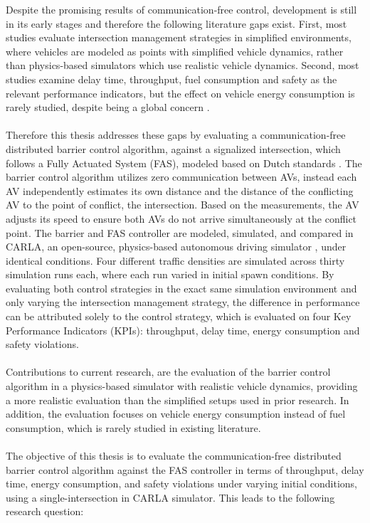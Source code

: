 Despite the promising results of communication-free control, development is still in its early stages and therefore the following literature gaps exist. First, most studies evaluate intersection management strategies in simplified environments, where vehicles are modeled as points with simplified vehicle dynamics, rather than physics-based simulators which use realistic vehicle dynamics. Second, most studies examine delay time, throughput, fuel consumption and safety as the relevant performance indicators, but the effect on vehicle energy consumption is rarely studied, despite being a global concern \parencite{hadjigeorgiou2022real}.
\\\\
Therefore this thesis addresses these gaps by evaluating a communication-free distributed barrier control algorithm, against a signalized intersection, which follows a Fully Actuated System (FAS), modeled based on Dutch standards \parencite{wilson2014handboek}. The barrier control algorithm utilizes zero communication between AVs, instead each  AV independently estimates its own distance and the distance of the conflicting AV to the  point of conflict, the intersection. Based on the measurements, the AV adjusts its speed to ensure both AVs do not arrive simultaneously at the conflict point. The barrier and FAS controller are modeled, simulated, and compared in CARLA, an open-source, physics-based autonomous driving simulator \parencite{dosovitskiy2017carla}, under identical conditions. Four different traffic densities are simulated across thirty simulation runs each, where each run varied in initial spawn conditions. By evaluating both control strategies in the exact same simulation environment and only varying the intersection management strategy, the difference in performance can be attributed solely to the control strategy, which is evaluated on four Key Performance Indicators (KPIs): throughput, delay time, energy consumption and safety violations.       
\\\\
Contributions to current research, are the evaluation of the barrier control algorithm in a physics-based simulator with realistic vehicle dynamics, providing a more realistic evaluation than the simplified setups used in prior research. In addition, the evaluation focuses on vehicle energy consumption instead of fuel consumption, which is rarely studied in existing literature. 
\\\\
The objective of this thesis is to evaluate the communication-free distributed barrier control algorithm against the FAS controller in terms of throughput, delay time, energy consumption, and safety violations under  varying initial conditions,  using a single-intersection in CARLA simulator. This leads to the following research question:\\
